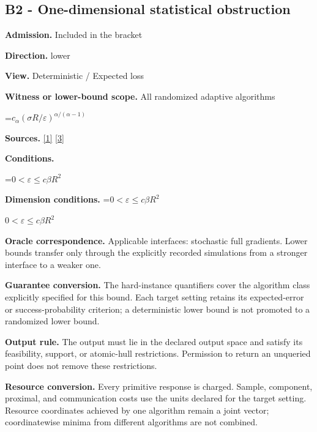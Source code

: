 \documentclass[10pt,a4paper]{article}
\newcommand{\AtlasMath}[1]{\par\begingroup\centering\setbox0=\hbox{$\displaystyle #1$}\ifdim\wd0>1.4\linewidth\typeout{ATLAS WIDE FORMULA: \the\wd0}\fi\ifdim\wd0>\linewidth\resizebox{\linewidth}{!}{\box0}\else\box0\fi\par\endgroup}
\newcommand{\AtlasInlineMath}[1]{\begingroup\setbox0=\hbox{$#1$}\ifdim\wd0>.4\linewidth\endgroup\AtlasMath{#1}\else\endgroup$#1$\fi}
\begin{document}
\subsection{B2 - One-dimensional statistical obstruction}


\textbf{Admission.} Included in the bracket



\textbf{Direction.} lower



\textbf{View.} Deterministic / Expected loss



\textbf{Witness or lower-bound scope.} All randomized adaptive algorithms



\AtlasMath{c_\alpha (\sigma R/\varepsilon)^{\alpha/(\alpha-1)}}


\textbf{Sources.} \href{https://arxiv.org/pdf/2609.10874}{[1]} \href{https://proceedings.mlr.press/v202/sadiev23a/sadiev23a.pdf}{[3]}



\textbf{Conditions.}
\AtlasMath{0<\varepsilon\le c\beta R^2}




\textbf{Dimension conditions.} \AtlasInlineMath{0<\varepsilon\le c\beta R^2}



\textbf{Oracle correspondence.} Applicable interfaces: stochastic full gradients. Lower bounds transfer only through the explicitly recorded simulations from a stronger interface to a weaker one.



\textbf{Guarantee conversion.} The hard-instance quantifiers cover the algorithm class explicitly specified for this bound. Each target setting retains its expected-error or success-probability criterion; a deterministic lower bound is not promoted to a randomized lower bound.



\textbf{Output rule.} The output must lie in the declared output space and satisfy its feasibility, support, or atomic-hull restrictions. Permission to return an unqueried point does not remove these restrictions.



\textbf{Resource conversion.} Every primitive response is charged. Sample, component, proximal, and communication costs use the units declared for the target setting. Resource coordinates achieved by one algorithm remain a joint vector; coordinatewise minima from different algorithms are not combined.
\end{document}
